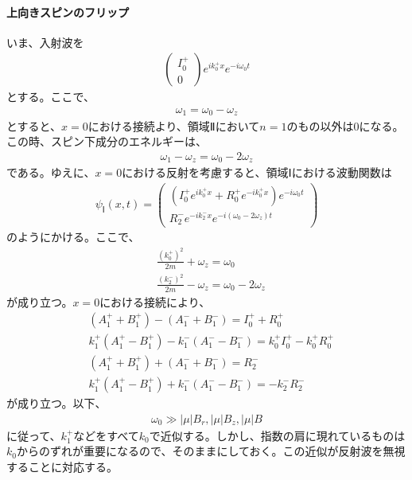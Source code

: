 \paragraph{上向きスピンのフリップ}
いま、入射波を
\begin{align}
\begin{pmatrix}
I_{0}^{+} \\
0
\end{pmatrix}
e^{ik_{0}^{+}x}e^{-i\omega_{0}t}
\end{align}
とする。ここで、
\begin{align}
\omega_{1}=\omega_{0}-\omega_{z}
\end{align}
とすると、$x=0$における接続より、領域Ⅱにおいて$n=1$のもの以外は$0$になる。この時、スピン下成分のエネルギーは、
\begin{align}
\omega_{1}-\omega_{z}=\omega_{0}-2\omega_{z}
\end{align}
である。ゆえに、$x=0$における反射を考慮すると、領域Ⅰにおける波動関数は
\begin{align}
{\psi}_{Ⅰ}(x,t)=
\begin{pmatrix}
(I_{0}^{+}e^{ik_{0}^{+}x}+R_{0}^{+}e^{-ik_{0}^{+}x})e^{-i\omega_{0}t} \\
R_{2}^{-}e^{-ik_{2}^{-}x}e^{-i(\omega_{0}-2\omega_{z})t}
\end{pmatrix}
\end{align}
のようにかける。ここで、
\begin{align}
&\frac{(k_{0}^+)^{2}}{2m}+\omega_{z}=\omega_{0} \\
&\frac{(k_{2}^-)^{2}}{2m}-\omega_{z}=\omega_{0}-2\omega_{z}
\end{align}
が成り立つ。$x=0$における接続により、
\begin{align}
&(A_{1}^{+}+B_{1}^{+})-(A_{1}^{-}+B_{1}^{-})=I_{0}^{+}+R_{0}^{+} \\
&k_{1}^{+}(A_{1}^{+}-B_{1}^{+})-k_{1}^{-}(A_{1}^{-}-B_{1}^{-})=k_{0}^{+}I_{0}^{+}-k_{0}^{+}R_{0}^{+} \\
&(A_{1}^{+}+B_{1}^{+})+(A_{1}^{-}+B_{1}^{-})=R_{2}^{-} \\
&k_{1}^{+}(A_{1}^{+}-B_{1}^{+})+k_{1}^{-}(A_{1}^{-}-B_{1}^{-})=-k_{2}^{-}R_{2}^{-}
\end{align}
が成り立つ。以下、
\begin{align}
\omega_{0} \gg |{\mu}|B_{r},  |{\mu}|B_{z},  |{\mu}|B
\end{align}
に従って、$k_{1}^{+}$などをすべて$k_{0}$で近似する。しかし、指数の肩に現れているものは$k_{0}$からのずれが重要になるので、そのままにしておく。この近似が反射波を無視することに対応する。
